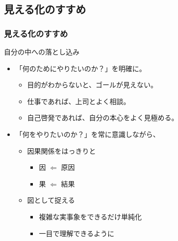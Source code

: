 \documentclass[12pt, dvipdfmx]{beamer}
\begin{document}
\subsection{見える化のすすめ}
\begin{frame}
	\frametitle{見える化のすすめ}
	\begin{block}{自分の中への落とし込み}
		\begin{itemize}
			\item 「何のためにやりたいのか？」を明確に。
			\begin{itemize}
				\item 目的がわからないと、ゴールが見えない。
				\item 仕事であれば、上司とよく相談。
				\item 自己啓発であれば、自分の本心をよく見極める。
			\end{itemize}
			\item 「何をやりたいのか？」を常に意識しながら、
			\begin{itemize}
				\item 因果関係をはっきりと
				\begin{itemize}
					\item 因 $\Leftarrow$ 原因
					\item 果 $\Leftarrow$ 結果
				\end{itemize}
				\item 図として捉える
				\begin{itemize}
					\item 複雑な実事象をできるだけ単純化
					\item 一目で理解できるように  
				\end{itemize}
			\end{itemize}
		\end{itemize}
	\end{block}
\end{frame}
\end{document}
